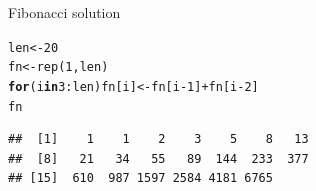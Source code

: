 \documentclass[xcolor=table,           xcolor=dvipsnames]{beamer}\usepackage[]{graphicx}\usepackage[]{color}
\makeatletter
\newcommand{\hlnum}[1]{\textcolor[rgb]{0,0,0}{#1}}
\newcommand{\hlopt}[1]{\textcolor[rgb]{0,0,0}{#1}}
\newcommand{\hlstd}[1]{\textcolor[rgb]{0,0,0}{#1}}
\newcommand{\hlkwa}[1]{\textcolor[rgb]{1,0,0}{\textbf{#1}}}
\newcommand{\hlkwb}[1]{\textcolor[rgb]{0,0,0}{#1}}
\newcommand{\hlkwd}[1]{\textcolor[rgb]{0,0,1}{#1}}
\newenvironment{kframe}{%
 \def\at@end@of@kframe{}%
 \ifinner\ifhmode%
  \def\at@end@of@kframe{\end{minipage}}%
  \begin{minipage}{\columnwidth}%
 \fi\fi%
 \def\FrameCommand##1{\hskip\@totalleftmargin \hskip-\fboxsep
 \colorbox{shadecolor}{##1}\hskip-\fboxsep
     \hskip-\linewidth \hskip-\@totalleftmargin \hskip\columnwidth}%
 \MakeFramed {\advance\hsize-\width
   \@totalleftmargin\z@ \linewidth\hsize
   \@setminipage}}%
 {\par\unskip\endMakeFramed%
 \at@end@of@kframe}
\newenvironment{knitrout}{}{} %
\makeatother
\begin{document}

\begin{frame}[fragile]{Fibonacci solution}
\begin{knitrout}
\color{fgcolor}\begin{kframe}
\begin{alltt}
\hlstd{len} \hlkwb{<-} \hlnum{20}
\hlstd{fn} \hlkwb{<-} \hlkwd{rep}\hlstd{(}\hlnum{1}\hlstd{, len)}
\hlkwa{for}\hlstd{(i} \hlkwa{in} \hlnum{3}\hlopt{:}\hlstd{len)  fn[i]} \hlkwb{<-} \hlstd{fn[i}\hlopt{-}\hlnum{1}\hlstd{]} \hlopt{+} \hlstd{fn[i}\hlopt{-}\hlnum{2}\hlstd{]}
\hlstd{fn}
\end{alltt}
\begin{verbatim}
##  [1]    1    1    2    3    5    8   13
##  [8]   21   34   55   89  144  233  377
## [15]  610  987 1597 2584 4181 6765
\end{verbatim}
\end{kframe}
\end{knitrout}
\end{frame}

\end{document}

